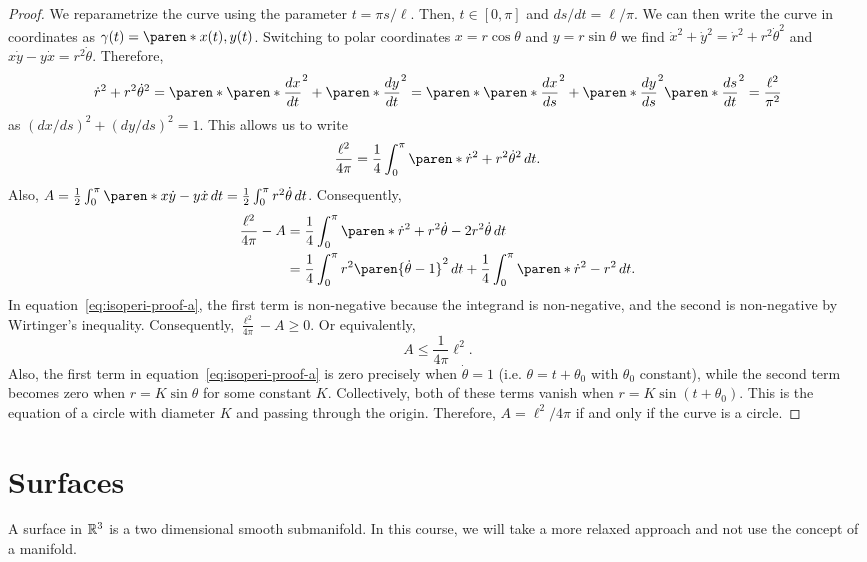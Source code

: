 \documentclass[11pt]{penrose}
\newcommand{\keyword}[1]{\textsf{#1}}
\begin{document}
\begin{proof}
    We reparametrize the curve using the parameter $t = \pi s / \ell$. Then, $t \in [0, \pi]$ and $ds/dt = \ell/\pi$. We can then write the curve in coordinates as $\gamma(t) = \paren*{x(t), y(t)}$. Switching to polar coordinates $x = r \cos\theta$ and $y = r \sin\theta$ we find $\dot{x}^2 + \dot{y}^2 = \dot{r}^2 + r^2 \dot{\theta}^2$ and $x\dot{y} - y\dot{x} = r^2 \dot{\theta}$. Therefore,
    \begin{equation}
        \dot{r}^2 + r^2 \dot{\theta}^2
        = \paren*{ \paren*{\frac{dx}{dt}}^2 + \paren*{\frac{dy}{dt}}^2 }
        = \paren*{ \paren*{\frac{dx}{ds}}^2 + \paren*{\frac{dy}{ds}}^2 } \paren*{\frac{ds}{dt}}^2
        = \frac{\ell^2}{\pi^2}
    \end{equation}
    as $(dx/ds)^2 + (dy/ds)^2 = 1$. This allows us to write
    \begin{equation}
        \frac{\ell^2}{4\pi} = \frac{1}{4} \int_0^\pi \paren*{\dot{r}^2 + r^2 \dot{\theta}^2} \,dt.
    \end{equation}
    Also, $A = \frac{1}{2} \int_0^\pi \paren*{x\dot{y} - y\dot{x}} \,dt = \frac{1}{2} \int_0^\pi r^2 \dot{\theta} \,dt$. Consequently,
    \begin{align}
        \frac{\ell^2}{4\pi} - A
        &= \frac{1}{4} \int_0^\pi \paren*{\dot{r}^2 + r^2 \dot{\theta} - 2r^2\dot{\theta}} \,dt\\
        &= \frac{1}{4} \int_0^\pi r^2 \paren{\dot{\theta}-1}^2 \,dt + \frac{1}{4}\int_0^\pi \paren*{\dot{r}^2 - r^2} \,dt.
        \label{eq:isoperi-proof-a}
    \end{align}
    In equation~\eqref{eq:isoperi-proof-a}, the first term is non-negative because the integrand is non-negative, and the second is non-negative by Wirtinger's inequality. Consequently, $\frac{\ell^2}{4\pi} - A \geq 0$. Or equivalently,
    \begin{equation}
        A \leq \frac{1}{4\pi} \ell^2.
    \end{equation}
    Also, the first term in equation~\eqref{eq:isoperi-proof-a} is zero precisely when $\dot{\theta} = 1$ (i.e. $\theta = t + \theta_0$ with $\theta_0$ constant), while the second term becomes zero when $r = K \sin\theta$ for some constant $K$. Collectively, both of these terms vanish when $r = K \sin(t + \theta_0)$. This is the equation of a circle with diameter $K$ and passing through the origin. Therefore, $A = \ell^2 / 4\pi$ if and only if the curve is a circle.
\end{proof}

\section{Surfaces}
A \keyword{surface} in $\mathbb{R}^3$ is a two dimensional smooth submanifold. In this course, we will take a more relaxed approach and not use the concept of a manifold.
\end{document}
